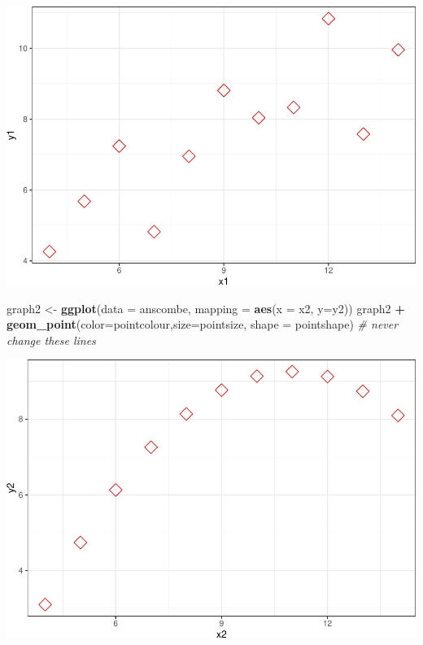 \documentclass[]{book}
\newenvironment{Shaded}{\begin{snugshade}}{\end{snugshade}}
\newcommand{\KeywordTok}[1]{\textcolor[rgb]{0.13,0.29,0.53}{\textbf{#1}}}
\newcommand{\DataTypeTok}[1]{\textcolor[rgb]{0.13,0.29,0.53}{#1}}
\newcommand{\StringTok}[1]{\textcolor[rgb]{0.31,0.60,0.02}{#1}}
\newcommand{\CommentTok}[1]{\textcolor[rgb]{0.56,0.35,0.01}{\textit{#1}}}
\newcommand{\OperatorTok}[1]{\textcolor[rgb]{0.81,0.36,0.00}{\textbf{#1}}}
\newcommand{\NormalTok}[1]{#1}
\begin{document}
\begin{center}\includegraphics[width=1\linewidth]{007-coding_files/figure-latex/unnamed-chunk-27-1} \end{center}

\begin{Shaded}
\begin{Highlighting}[]
\NormalTok{graph2 <-}\StringTok{ }\KeywordTok{ggplot}\NormalTok{(}\DataTypeTok{data =}\NormalTok{ anscombe, }\DataTypeTok{mapping =} \KeywordTok{aes}\NormalTok{(}\DataTypeTok{x =}\NormalTok{ x2, }\DataTypeTok{y=}\NormalTok{y2))}
\NormalTok{graph2 }\OperatorTok{+}\StringTok{ }\KeywordTok{geom_point}\NormalTok{(}\DataTypeTok{color=}\NormalTok{pointcolour,}\DataTypeTok{size=}\NormalTok{pointsize, }\DataTypeTok{shape =}\NormalTok{ pointshape) }\CommentTok{# never change these lines}
\end{Highlighting}
\end{Shaded}

\begin{center}\includegraphics[width=1\linewidth]{007-coding_files/figure-latex/unnamed-chunk-27-2} \end{center}
\end{document}
